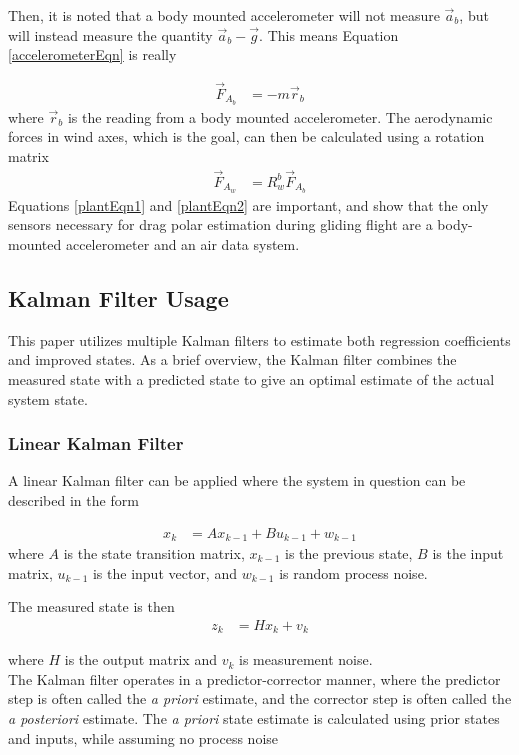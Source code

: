 Then, it is noted that a body mounted accelerometer will not measure $\vec{a}_b$, but will instead measure the quantity $\vec{a}_b - \vec{g}$. This means Equation \ref{accelerometerEqn} is really

\begin{align}
\label{plantEqn1}
\vec{F}_{A_b} &= -m\vec{r}_b
\end{align}
where $\vec{r}_b$ is the reading from a body mounted accelerometer. The aerodynamic forces in wind axes, which is the goal, can then be calculated using a rotation matrix
\begin{align}
\label{plantEqn2}
\vec{F}_{A_w} &= R^b_w\vec{F}_{A_b}
\end{align}
Equations \ref{plantEqn1} and \ref{plantEqn2} are important, and show that the only sensors necessary for drag polar estimation during gliding flight are a body-mounted accelerometer and an air data system.

\subsection*{Kalman Filter Usage}
\label{kalman-filter}
This paper utilizes multiple Kalman filters to estimate both regression coefficients and improved states. As a brief overview, the Kalman filter combines the measured state with a predicted state to give an optimal\cite{kalman60} estimate of the actual system state.

\subsubsection*{Linear Kalman Filter}
A linear Kalman filter can be applied\cite{welch1995introduction} where the system in question can be described in the form 

\begin{align}
x_k &= Ax_{k-1} + Bu_{k-1}+w_{k-1}
\end{align}
where $A$ is the state transition matrix, $x_{k-1}$ is the previous state, $B$ is the input matrix, $u_{k-1}$ is the input vector, and $w_{k-1}$ is random process noise.

The measured state is then 
\begin{align}
z_k &= Hx_k+v_k
\end{align} 

where $H$ is the output matrix and $v_k$ is measurement noise.\\
The Kalman filter operates in a predictor-corrector manner, where the predictor step is often called the \textit{a priori} estimate, and the corrector step is often called the \textit{a posteriori} estimate. The \textit{a priori} state estimate is calculated using prior states and inputs, while assuming no process noise

